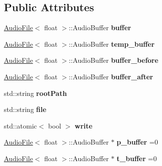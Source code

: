 \subsection*{Public Attributes}
\begin{DoxyCompactItemize}
\item 
\mbox{\label{classfile__record_a2cde61cd39d07b72df01aed74b55a465}} 
\hyperlink{classAudioFile}{Audio\+File}$<$ float $>$\+::Audio\+Buffer {\bfseries buffer}
\item 
\mbox{\label{classfile__record_a29a72f46b29d090b0917f677c5066850}} 
\hyperlink{classAudioFile}{Audio\+File}$<$ float $>$\+::Audio\+Buffer {\bfseries temp\+\_\+buffer}
\item 
\mbox{\label{classfile__record_a7b2c33679842d309deec6be9684401ee}} 
\hyperlink{classAudioFile}{Audio\+File}$<$ float $>$\+::Audio\+Buffer {\bfseries buffer\+\_\+before}
\item 
\mbox{\label{classfile__record_a309e591dc171dd5c2f99d6307f7f616c}} 
\hyperlink{classAudioFile}{Audio\+File}$<$ float $>$\+::Audio\+Buffer {\bfseries buffer\+\_\+after}
\item 
\mbox{\label{classfile__record_a161c3ed15c9b01dbfc552234e63479f4}} 
std\+::string {\bfseries root\+Path}
\item 
\mbox{\label{classfile__record_acde5edfb344edae7f3f8cf26e363f737}} 
std\+::string {\bfseries file}
\item 
\mbox{\label{classfile__record_ab33ddeca248a16e22312368ad34b2b36}} 
std\+::atomic$<$ bool $>$ {\bfseries write}
\item 
\mbox{\label{classfile__record_a2b6625e3c8db0e24a99cfd2f6c8168cb}} 
\hyperlink{classAudioFile}{Audio\+File}$<$ float $>$\+::Audio\+Buffer $\ast$ {\bfseries p\+\_\+buffer} =0
\item 
\mbox{\label{classfile__record_aedccd6a5df58fc9479cd3dbb46e7d151}} 
\hyperlink{classAudioFile}{Audio\+File}$<$ float $>$\+::Audio\+Buffer $\ast$ {\bfseries t\+\_\+buffer} =0
\item 

\end{DoxyCompactItemize}
